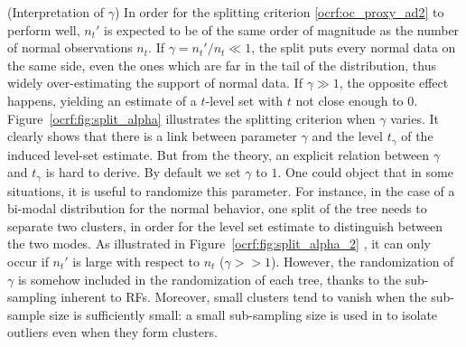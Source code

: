 \begin{remark}({\sc Interpretation of $\gamma$})
\label{ocrf:rk:gamma}
In order for the splitting criterion \eqref{ocrf:oc_proxy_ad2} to perform well, $n_t'$ is expected to be of the same order of magnitude as the number of normal observations $n_t$. If $\gamma = n_t'/n_t \ll 1$, the split puts every normal data on the same side, even the ones which are far in the tail of the distribution, thus widely over-estimating the support of normal data. If $\gamma \gg 1$, the opposite effect happens, yielding an estimate of a $t$-level set with $t$ not close enough to $0$.
Figure~\ref{ocrf:fig:split_alpha}
 illustrates the splitting criterion when $\gamma$ varies. It clearly shows that there is a link between parameter $\gamma$ and the level $t_\gamma$ of the induced level-set estimate. But from the theory, an explicit relation between $\gamma$ and $t_\gamma$ is hard to derive. By default we set $\gamma$ to $1$.
%
One could object that in some situations, it is useful to randomize this parameter. For instance, in the case of a bi-modal distribution for the normal behavior, one split of the tree needs to separate two clusters, in order for the level set estimate to distinguish between the two modes. As illustrated in Figure~\ref{ocrf:fig:split_alpha_2}
, it can only occur if $n_t'$ is large with respect to $n_t$ ($\gamma >> 1$). However, the randomization of $\gamma$ is somehow included in the randomization of each tree, thanks to the sub-sampling inherent to RFs.
%
Moreover, small clusters tend to vanish when the sub-sample size is sufficiently small: a small sub-sampling size is used in \cite{Liu2008} to isolate outliers even when they form clusters.
\end{remark}





